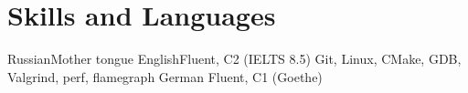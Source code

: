 \section{Skills and Languages}
                             {Russian}{Mother tongue}          
                           {English}{Fluent, C2 (IELTS 8.5)} 
    {Git, Linux, CMake, GDB, Valgrind, perf, flamegraph}    {German} {Fluent, C1 (Goethe)}    
